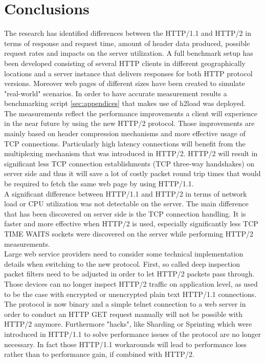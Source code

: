 \section{Conclusions}
\label{conclusion}

The research has identified differences between the HTTP/1.1 and HTTP/2 in terms of response and request time, amount of header data produced, possible request rates and impacts on the server utilization. A full benchmark setup has been developed consisting of several HTTP clients in different geographically locations and a server instance that delivers responses for both HTTP protocol versions. Moreover web pages of different sizes have been created to simulate "real-world" scenarios. In order to have accurate measurement results a benchmarking script \ref{sec:appendices} that makes use of h2load \cite{h2load} was deployed. 
\\
The measurements reflect the performance improvements a client will experience in the near future by using the new HTTP/2 protocol. Those improvements are mainly based on header compression mechanisms and more effective usage of TCP connections. Particularly high latency connections will benefit from the multiplexing mechanism that was introduced in HTTP/2. HTTP/2 will result in significant less TCP connection establishments (TCP three-way handshakes) on server side and thus it will save a lot of costly packet round trip times that would be required to fetch the same web page by using HTTP/1.1.
\\
A significant difference between HTTP/1.1 and HTTP/2 in terms of network load or CPU utilization was not detectable on the server. The main difference that has been discovered on server side is the TCP connection handling. It is faster and more effective when HTTP/2 is used, especially significantly less TCP TIME WAITS sockets were discovered on the server while performing HTTP/2 measurements.
\\
Large web service providers need to consider some technical implementation details when switching to the new protocol. First, so called deep inspection packet filters need to be adjusted in order to let HTTP/2 packets pass through. Those devices can no longer inspect HTTP/2 traffic on application level, as used to be the case with encrypted or unencrypted plain text HTTP/1.1 connections. The protocol is now binary and a simple telnet connection to a web server in order to conduct an HTTP GET request manually will not be possible with HTTP/2 anymore. Furthermore "hacks", like Sharding or Sprinting which were introduced in HTTP/1.1 to solve performance issues of the protocol are no longer necessary. In fact those HTTP/1.1 workarounds will lead to performance loss rather than to performance gain, if combined with HTTP/2.    

